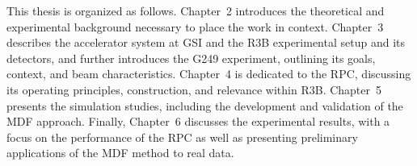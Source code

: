 This thesis is organized as follows. Chapter~2 introduces the theoretical and experimental background necessary to place the work in context. Chapter~3 describes the accelerator system at GSI and the \gls{R3B} experimental setup and its detectors, and further introduces the G249 experiment, outlining its goals, context, and beam characteristics. Chapter~4 is dedicated to the RPC, discussing its operating principles, construction, and relevance within \gls{R3B}. Chapter~5 presents the simulation studies, including the development and validation of the MDF approach. Finally, Chapter~6 discusses the experimental results, with a focus on the performance of the RPC as well as presenting preliminary applications of the MDF method to real data.